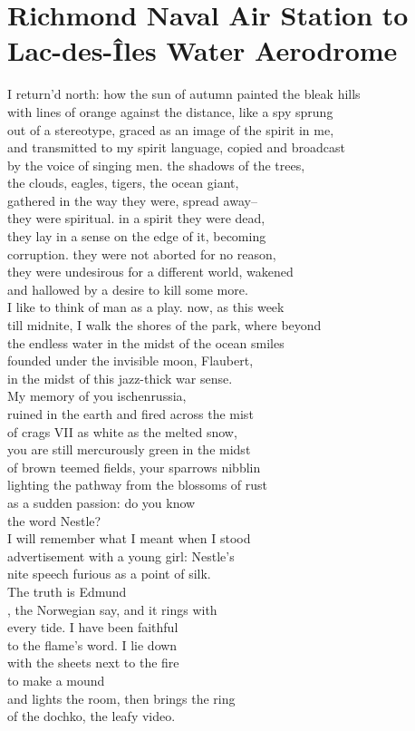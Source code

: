 \documentclass[smalldemyvopaper,11pt,twoside,onecolumn,openright,extrafontsizes]{memoir}
\begin{document}
\chapter{Richmond Naval Air Station to Lac-des-Îles Water Aerodrome}
I return'd north: how the sun of autumn painted the bleak hills
\\with lines of orange against the distance, like a spy sprung
\\out of a stereotype, graced as an image of the spirit in me,
\\and transmitted to my spirit language, copied and broadcast
\\by the voice of singing men. the shadows of the trees,
\\the clouds, eagles, tigers, the ocean giant,
\\gathered in the way they were, spread away--
\\they were spiritual. in a spirit they were dead,
\\they lay in a sense on the edge of it, becoming
\\corruption. they were not aborted for no reason,
\\they were undesirous for a different world, wakened
\\and hallowed by a desire to kill some more.
\\I like to think of man as a play. now, as this week
\\till midnite, I walk the shores of the park, where beyond
\\the endless water in the midst of the ocean smiles
\\founded under the invisible moon, Flaubert,
\\in the midst of this jazz-thick war sense.
\\My memory of you ischenrussia,
\\ruined in the earth and fired across the mist
\\of crags VII as white as the melted snow,
\\you are still mercurously green in the midst
\\of brown teemed fields, your sparrows nibblin
\\lighting the pathway from the blossoms of rust
\\as a sudden passion: do you know
\\the word Nestle?
\\I will remember what I meant when I stood
\\advertisement with a young girl: Nestle's
\\nite speech furious as a point of silk.
\\The truth is Edmund
\\, the Norwegian say, and it rings with
\\every tide. I have been faithful
\\to the flame's word. I lie down
\\with the sheets next to the fire
\\to make a mound
\\and lights the room, then brings the ring
\\of the dochko, the leafy video.
\end{document}
